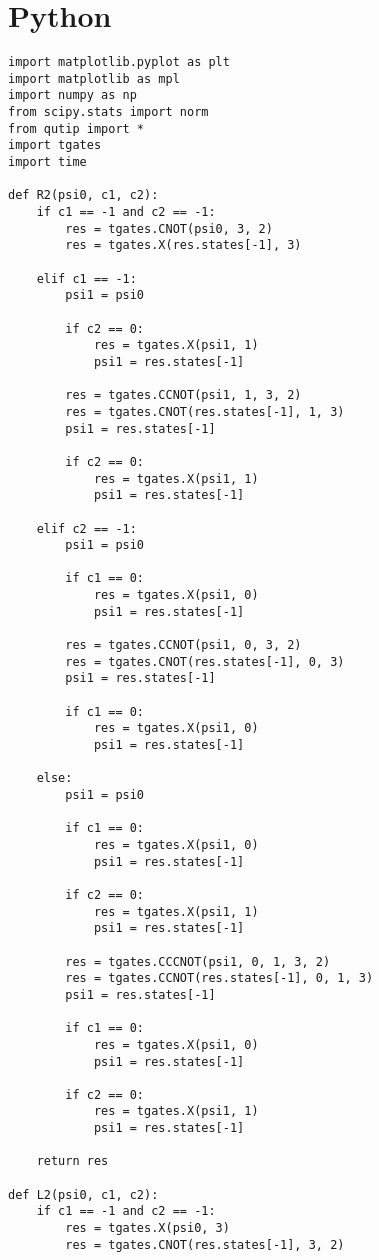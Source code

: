 \section{Python}

\begin{verbatim}
import matplotlib.pyplot as plt
import matplotlib as mpl
import numpy as np
from scipy.stats import norm
from qutip import *
import tgates
import time

def R2(psi0, c1, c2):
    if c1 == -1 and c2 == -1:
        res = tgates.CNOT(psi0, 3, 2)
        res = tgates.X(res.states[-1], 3)

    elif c1 == -1:
        psi1 = psi0

        if c2 == 0:
            res = tgates.X(psi1, 1)
            psi1 = res.states[-1]

        res = tgates.CCNOT(psi1, 1, 3, 2)
        res = tgates.CNOT(res.states[-1], 1, 3)
        psi1 = res.states[-1]

        if c2 == 0:
            res = tgates.X(psi1, 1)
            psi1 = res.states[-1]

    elif c2 == -1:
        psi1 = psi0

        if c1 == 0:
            res = tgates.X(psi1, 0)
            psi1 = res.states[-1]

        res = tgates.CCNOT(psi1, 0, 3, 2)
        res = tgates.CNOT(res.states[-1], 0, 3)
        psi1 = res.states[-1]

        if c1 == 0:
            res = tgates.X(psi1, 0)
            psi1 = res.states[-1]

    else:
        psi1 = psi0

        if c1 == 0:
            res = tgates.X(psi1, 0)
            psi1 = res.states[-1]

        if c2 == 0:
            res = tgates.X(psi1, 1)
            psi1 = res.states[-1]

        res = tgates.CCCNOT(psi1, 0, 1, 3, 2)
        res = tgates.CCNOT(res.states[-1], 0, 1, 3)
        psi1 = res.states[-1]

        if c1 == 0:
            res = tgates.X(psi1, 0)
            psi1 = res.states[-1]

        if c2 == 0:
            res = tgates.X(psi1, 1)
            psi1 = res.states[-1]

    return res

def L2(psi0, c1, c2):
    if c1 == -1 and c2 == -1:
        res = tgates.X(psi0, 3)
        res = tgates.CNOT(res.states[-1], 3, 2)


\end{verbatim}
